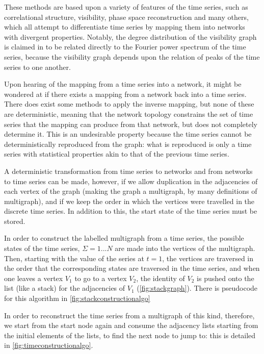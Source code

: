 \documentclass[12pt]{article}
\begin{document}
These methods are based upon a variety of features of the time series, such as correlational structure\cite{correlationgraph}, visibility\cite{lacasa}, phase space reconstruction\cite{phasespacegraph} and many others, which all attempt to differentiate time series by mapping them into networks with divergent properties. Notably, the degree distribution of the visibility graph is claimed in \cite{lacasa} to be related directly to the Fourier power spectrum of the time series, because the visibility graph depends upon the relation of peaks of the time series to one another.

Upon hearing of the mapping from a time series into a network, it might be wondered at if there exists a mapping from a network back into a time series. There does exist some methods to apply the inverse mapping, but none of these are deterministic, meaning that the network topology constrains the set of time series that the mapping can produce from that network, but does not completely determine it\cite{campanharo}. This is an undesirable property because the time series cannot be deterministically reproduced from the graph: what is reproduced is only a time series with statistical properties akin to that of the previous time series.

A deterministic transformation from time series to networks and from networks to time series can be made, however, if we allow duplication in the adjacencies of each vertex of the graph (making the graph a multigraph, by many definitions of multigraph\cite{multigraph}), and if we keep the order in which the vertices were travelled in the discrete time series. In addition to this, the start state of the time series must be stored.

In order to construct the labelled multigraph from a time series, the possible states of the time series, $\Sigma = {1 ... N}$ are made into the vertices of the multigraph. Then, starting with the value of the series at $t =1$, the vertices are traversed in the order that the corresponding states are traversed in the time series, and when one leaves a vertex $V_1$ to go to a vertex $V_2$, the identity of $V_2$ is pushed onto the list (like a stack) for the adjacencies of $V_1$ (\ref{fig:stackgraph}). There is pseudocode for this algorithm in \ref{fig:stackconstructionalgo}

In order to reconstruct the time series from a multigraph of this kind, therefore, we start from the start node again and consume the adjacency lists starting from the initial elements of the lists, to find the next node to jump to: this is detailed in \ref{fig:timeconstructionalgo}.
\end{document}
